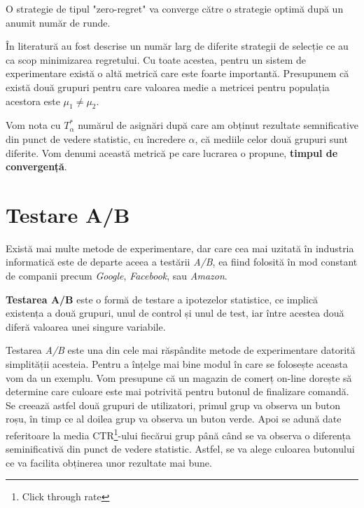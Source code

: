 \begin{remark}
	O strategie de tipul "zero-regret" va converge către o strategie optimă după un anumit număr de runde.
\end{remark}

În literatură au fost descrise un număr larg de diferite strategii de selecție ce au ca scop minimizarea regretului. Cu toate acestea, pentru un sistem de experimentare există o altă metrică care este foarte importantă. Presupunem că există două grupuri pentru care valoarea medie a metricei pentru populația acestora este $\mu_1 \neq \mu_2$.

\begin{definition}
	Vom nota cu $T_{\alpha}^*$ numărul de asignări după care am obținut rezultate semnificative din punct de vedere statistic, cu încredere $\alpha$, că mediile celor două grupuri sunt diferite. Vom denumi această metrică pe care lucrarea o propune, \textbf{timpul de convergență}.
\end{definition}

\section{Testare A/B}

Există mai multe metode de experimentare, dar care cea mai uzitată în industria informatică este de departe aceea a testării \textit{A/B}, ea fiind folosită în mod constant de companii precum \textit{Google}, \textit{Facebook}, sau \textit{Amazon}. 

\begin{definition}
	\textbf{Testarea A/B} este o formă de testare a ipotezelor statistice, ce implică existența a două grupuri, unul de control și unul de test, iar între acestea două diferă valoarea unei singure variabile.
\end{definition}

Testarea \textit{A/B} este una din cele mai răspândite metode de experimentare datorită simplității acesteia. Pentru a înțelge mai bine modul în care se folosește aceasta vom da un exemplu. Vom presupune că un magazin de comerț on-line dorește să determine care culoare este mai potrivită pentru butonul de finalizare comandă. Se creează astfel două grupuri de utilizatori, primul grup va observa un buton roșu, în timp ce al doilea grup va observa un buton verde. Apoi se adună date referitoare la media CTR\footnote{Click through rate}-ului fiecărui grup până când se va observa o diferența seminificativă din punct de vedere statistic. Astfel, se va alege culoarea butonului ce va facilita obținerea unor rezultate mai bune. 


